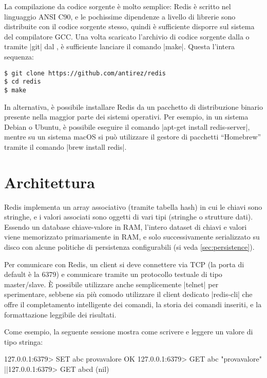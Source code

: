 La compilazione da codice sorgente è molto semplice: Redis è scritto nel linguaggio ANSI C90, e le
pochissime dipendenze a livello di librerie sono distribuite con il codice sorgente stesso, quindi è
sufficiente disporre sul sistema del compilatore GCC. Una volta scaricato l'archivio di codice
sorgente dalla  o tramite
\cverb|git| dal , è
sufficiente lanciare il comando \cverb|make|. Questa l'intera sequenza:

\medskip
\begin{lstlisting}
$ git clone https://github.com/antirez/redis
$ cd redis
$ make
\end{lstlisting}

In alternativa, è possibile installare Redis da un pacchetto di distribuzione binario
presente nella maggior parte dei sistemi operativi. Per esempio, in un sistema Debian
o Ubuntu, è possibile eseguire il comando \cverb|apt-get install redis-server|, mentre
su un sistema macOS si può utilizzare il gestore di pacchetti ``Homebrew'' tramite il
comando \cverb|brew install redis|.

\section{Architettura}
\label{sec:redis:arch}

Redis implementa un array associativo (tramite tabella hash) in cui le chiavi sono stringhe, e i
valori associati sono oggetti di vari tipi (stringhe o strutture dati). Essendo un database
chiave-valore in RAM, l'intero dataset di chiavi e valori viene memorizzato primariamente in RAM, e
solo successivamente serializzato su disco con alcune politiche di persistenza configurabili (si
veda \autoref{sec:persistence}).

Per comunicare con Redis, un client si deve connettere via TCP (la porta di default è la 6379) e
comunicare tramite un protocollo testuale di tipo master/slave. È possibile utilizzare
anche semplicemente \cverb|telnet| per sperimentare, sebbene sia più comodo utilizzare il
client dedicato \cverb|redis-cli| che offre il completamento intelligente dei comandi, la
storia dei comandi inseriti, e la formattazione leggibile dei risultati.

Come esempio, la seguente sessione mostra come scrivere e leggere un valore di tipo
stringa:

\begin{commentedsource}[style=redis]
127.0.0.1:6379> SET abc provavalore
OK
127.0.0.1:6379> GET abc
"provavalore"
|\lnote|127.0.0.1:6379> GET abcd
(nil)
\end{commentedsource}

